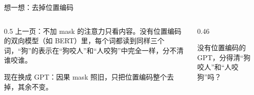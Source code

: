 \documentclass[aspectratio=169,10pt,UTF8,fontset=none]{ctexbeamer}
\begin{document}
\begin{frame}{想一想：去掉位置编码}
  \begin{columns}[c]
    \begin{column}{0.5\textwidth}
      上一页：不加 mask 的注意力只看内容。没有位置编码的双向模型（如 BERT）里，每个词都读到同样三个词，“狗”的表示在“狗咬人”和“人咬狗”中完全一样，分不清谁咬谁。
      \vspace{3mm}

      现在换成 GPT：因果 mask 照旧，只把位置编码整个去掉，其余不变。
    \end{column}
    \begin{column}{0.46\textwidth}
      \begin{hook}
        没有位置编码的 GPT，分得清“狗咬人”和“人咬狗”吗？
        \par\medskip
      \end{hook}
    \end{column}
  \end{columns}
\end{frame}

\newcommand{\causalpanel}[4]{%
  \begin{scope}[shift={#1}]
    \foreach \w [count=\i] in {#2}{%
      \node[nsoft,minimum width=8mm,font=\small] (t\i) at (\i*15,0) {\w};
      \ifnum\i=#3\relax
        \node[circle,draw=GOrange,fill=GAmber,line width=0.9pt,minimum size=6.5mm,inner sep=0pt,font=\scriptsize] (h\i) at (\i*15,15) {\w};
      \else
        \node[circle,draw=GSlate!70,fill=white,line width=0.6pt,minimum size=6.5mm,inner sep=0pt,font=\scriptsize] (h\i) at (\i*15,15) {\w};
      \fi}
    \foreach \i in {1,2,3}{\foreach \j in {1,...,\i}{%
      \ifnum\i=#3\relax\draw[GOrange,line width=0.8pt] (t\j.north) -- (h\i.south);
      \else\draw[GSlate!45,line width=0.5pt] (t\j.north) -- (h\i.south);\fi}}
    \node[lbln,anchor=east,font=\small\bfseries] at (7,7.5) {#4};
  \end{scope}}
\end{document}
